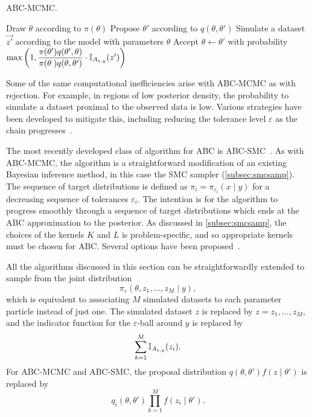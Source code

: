 \begin{algorithm}
  \caption{\gls{ABC}-\gls{MCMC}.}
  \begin{algorithmic}
    \State Draw $\theta$ according to $\pi(\theta)$
    \Loop
      \State Propose $\theta'$ according to $q(\theta, \theta')$
      \State Simulate a dataset $\vec{z'}$ according to the model with
             parameters $\theta$
      \State Accept $\theta \gets \theta'$ with probability
      $\max \left( 1, 
       \dfrac{\pi(\theta') q(\theta', \theta)}
             {\pi(\theta\phantom{'}) q(\theta, \theta')} 
       \cdot \mathbb{I}_{A_{\varepsilon, y}}(z') \right)$
    \EndLoop
  \end{algorithmic}
  \label{alg:abcmcmc}
\end{algorithm}

Some of the same computational inefficiencies arise with \gls{ABC}-\gls{MCMC}
as with rejection. For example, in regions of low posterior density, the
probability to simulate a dataset proximal to the observed data is low. Various
strategies have been developed to mitigate this, including reducing the
tolerance level $\varepsilon$ as the chain
progresses~\autocite{ratmann2007using}.

The most recently developed class of algorithm for \gls{ABC} is
\gls{ABC}-\gls{SMC}~\autocite{sisson2007sequential, beaumont2009adaptive}. As
with \gls{ABC}-\gls{MCMC}, the algorithm is a straightforward modification of
an existing Bayesian inference method, in this case the \gls{SMC} sampler
(\cref{subsec:smcsamp}). The sequence of target distributions is defined as
$\pi_i = \pi_{\varepsilon_i}(x \mid y)$ for a decreasing sequence of tolerances
$\varepsilon_i$. The intention is for the algorithm to progress smoothly
through a sequence of target distributions which ends at the \gls{ABC}
approximation to the posterior. As discussed in \cref{subsec:smcsamp}, the
choices of the kernels $K$ and $L$ is problem-specific, and so appropriate
kernels must be chosen for \gls{ABC}. Several options have been
proposed~\autocite{beaumont2009adaptive, sisson2007sequential,
del2012adaptive}.

All the algorithms discussed in this section can be straightforwardly extended
to sample from the joint distribution
\[
  \pi_\varepsilon(\theta, z_1, \ldots, z_M \mid y),
\]
which is equivalent to associating $M$ simulated datasets to each parameter
particle instead of just one. The simulated dataset $z$ is replaced by
$z = z_1, \ldots, z_M$, and the indicator function for the
$\varepsilon$-ball around $y$ is replaced by
\[
  \sum_{k=1}^M \mathbb{I}_{A_{\varepsilon, y}} (z_i).
\]
For \gls{ABC}-\gls{MCMC} and \gls{ABC}-\gls{SMC}, the proposal distribution
$q(\theta, \theta') f(z \mid \theta')$ is replaced by
\[
  q_i(\theta, \theta') \prod_{k=1}^M f(z_i \mid \theta').
\]

